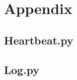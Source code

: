 \documentclass[a4paper,12pt]{article}
\begin{document}
\newpage


\section{Appendix}
\subsection{Heartbeat.py}


\subsection{Log.py}

\end{document}
